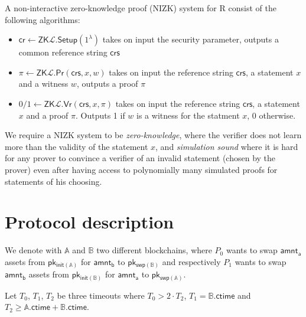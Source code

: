 \documentclass{article}      	%
\begin{document}
A non-interactive zero-knowledge proof (NIZK) system for R consist of the following algorithms:
\begin{itemize}
    \item $\mathsf{cr} \gets \mathsf{ZK}\mathcal{L}.\mathsf{Setup}(1^\lambda)$ takes on input the security parameter, outputs a common reference string $\mathsf{crs}$
    \item $\pi \gets \mathsf{ZK}\mathcal{L}.\mathsf{Pr}(\mathsf{crs}, x, w)$ takes on input the reference string $\mathsf{crs}$, a statement $x$ and a witness $w$, outputs a proof $\pi$
    \item $0/1 \gets \mathsf{ZK}\mathcal{L}.\mathsf{Vr}(\mathsf{crs}, x,\pi)$ takes on input the reference string $\mathsf{crs}$, a statement $x$ and a proof $\pi$. Outputs 1 if $w$ is a witness for the statment $x$, 0 otherwise.
\end{itemize}
We require a NIZK system to be \textit{zero-knowledge}, where the verifier does not learn more than the validity of the statement $x$, and \textit{simulation sound} where it is hard for any prover
to convince a verifier of an invalid statement (chosen by the prover) even after having access to polynomially many simulated proofs for statements of his choosing.


\section{Protocol description}







We denote with $\mathbb{A}$ and $\mathbb{B}$ two different blockchains, where $P_0$ wants to swap $\mathsf{amnt_a}$ assets from $\mathsf{pk_{init(\mathbb{A})}}$ for $\mathsf{amnt_b}$ to $\mathsf{pk_{swp(\mathbb{B})}}$ and respectively $P_1$ wants to swap $\mathsf{amnt_b}$ assets from $\mathsf{pk_{init(\mathbb{B})}}$ for $\mathsf{amnt_a}$ to $\mathsf{pk_{swp(\mathbb{A})}}$.


Let $T_0$, $T_1$, $T_2$ be three timeouts where  $T_0 > 2\cdot T_2$, $T_1 =  \mathbb{B}.\mathsf{ctime}$ and $T_2 \geq \mathbb{A}.\mathsf{ctime} + \mathbb{B}.\mathsf{ctime}$. 
\end{document}
